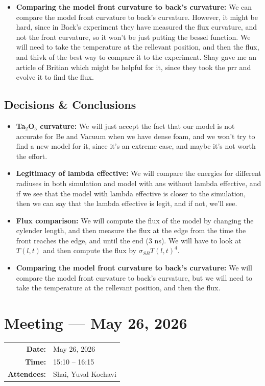 \documentclass[11pt,a4paper]{article}
\newcommand{\meetingmeta}[3]{
    \noindent
    \colorbox{LightBg}{
        \begin{minipage}{\dimexpr\textwidth-2\fboxsep\relax}
            \vspace{0.5em}
            \hspace{0.5em}
            \begin{tabular}{r l}
                \textbf{Date:} & #1 \\
                \textbf{Time:} & #2 \\
                \textbf{Attendees:} & #3
            \end{tabular}
            \vspace{0.5em}
        \end{minipage}
    }
    \vspace{1em}
}
\begin{document}
\begin{itemize}
    \item \textbf{Comparing the model front curvature to back's curvature:} We can compare the model front curvature to back's curvature. However, it might be hard, since in Back's experiment they have measured the flux curvature, and not the front curvature, so it won't be just putting the bessel function. We will need to take the temperature at the rellevant position, and then the flux, and thivk of the best way to compare it to the experiment. Shay gave me an article of Britian which might be helpful for it, since they took the prr and evolve it to find the flux.
\end{itemize}

\subsection{Decisions \& Conclusions}
\begin{itemize}
    \item \textbf{Ta$_2$O$_5$ curvature:} We will just accept the fact that our model is not accurate for Be and Vacuum when we have dense foam, and we won't try to find a new model for it, since it's an extreme case, and maybe it's not worth the effort.
    \item \textbf{Legitimacy of lambda effective:} We will compare the energies for different radiuses in both simulation and model with ans without lambda effective, and if we see that the model with lambda effective is closer to the simulation, then we can say that the lambda effective is legit, and if not, we'll see.
    \item \textbf{Flux comparison:} We will compute the flux of the model by changing the cylender length, and then measure the flux at the edge from the time the front reaches the edge, and until the end (3 ns). We will have to look at $T(l,t)$ and then compute the flux by $\sigma_{SB}T(l,t)^4$. 
    \item \textbf{Comparing the model front curvature to back's curvature:} We will compare the model front curvature to back's curvature, but we will need to take the temperature at the rellevant position, and then the flux.
\end{itemize}

\newpage
\section{Meeting --- May 26, 2026}
\meetingmeta{May 26, 2026}{15:10 -- 16:15}{Shai, Yuval Kochavi}
\end{document}
